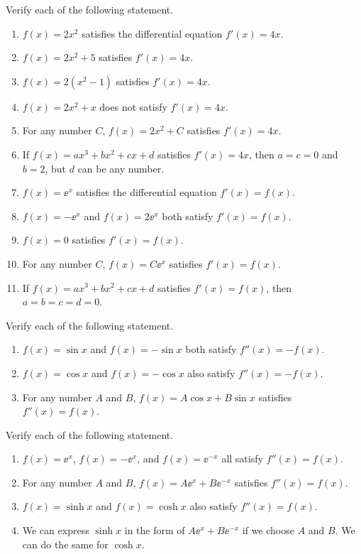 \documentclass[11pt,pdfa,lastpage]{MishoNote}
\begin{document}
\begin{enumerate}[resume]
  \itemA Verify each of the following statement.
  \begin{enumerate}
    \item $f(x)=2x^2$ satisfies the differential equation $f'(x)=4x$.
    \item $f(x)=2x^2+5$ satisfies $f'(x)=4x$.
    \item $f(x)=2(x^2-1)$ satisfies $f'(x)=4x$.
    \item $f(x)=2x^2+x$ does not satisfy $f'(x)=4x$.
    \item For any number $C$, $f(x)=2x^2 + C$ satisfies $f'(x)=4x$.
    \item If $f(x)=ax^3+bx^2+cx+d$ satisfies $f'(x)=4x$, then $a=c=0$ and $b=2$, but $d$ can be any number.
  \medskip
    \item $f(x)=\ee^x$ satisfies the differential equation $f'(x)=f(x)$.
    \item $f(x)=-\ee^x$ and $f(x)=2\ee^x$ both satisfy $f'(x)=f(x)$.
    \item $f(x)=0$ satisfies $f'(x)=f(x)$.
    \item For any number $C$, $f(x)=C\ee^{x}$ satisfies $f'(x)=f(x)$.
    \item If $f(x)=ax^3+bx^2+cx+d$ satisfies $f'(x)=f(x)$, then $a=b=c=d=0$.
  \end{enumerate}
  \itemB Verify each of the following statement.
  \begin{enumerate}
    \item $f(x)=\sin x$ and $f(x)=-\sin x$ both satisfy $f''(x)=-f(x)$.
    \item $f(x)=\cos x$ and $f(x)=-\cos x$ also satisfy $f''(x)=-f(x)$.
    \item For any number $A$ and $B$, $f(x)=A\cos x+B\sin x$ satisfies $f''(x)=f(x)$.
  \end{enumerate}
  \itemC Verify each of the following statement.
  \begin{enumerate}
    \item $f(x)=\ee^x$, $f(x)=-\ee^x$, and $f(x)=\ee^{-x}$ all satisfy $f''(x)=f(x)$.
    \item For any number $A$ and $B$, $f(x)=A\ee^x+B\ee^{-x}$ satisfies $f''(x)=f(x)$.
    \item $f(x)=\sinh x$ and $f(x)=\cosh x$ also satisfy $f''(x)=f(x)$.
    \item We can express $\sinh x$ in the form of $A\ee^{x}+B\ee^{-x}$ if we choose $A$ and $B$. We can do the same for $\cosh x$.
  \end{enumerate}
\end{enumerate}
\end{document}
